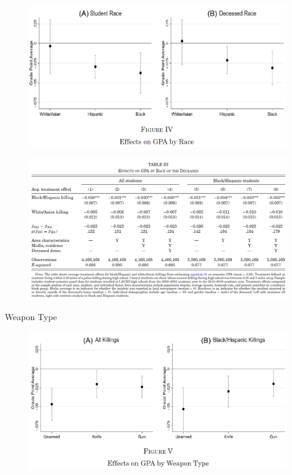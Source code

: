 \documentclass[dvipdfmx]{beamer}
\begin{document}
\begin{frame}{}
  \begin{figure}
    \centering
    \includegraphics[scale = .55]{fig_tab/os20220113/F4}
  \end{figure}
\end{frame}

\begin{frame}{}
  \begin{figure}
    \centering
    \includegraphics[scale = .55]{fig_tab/os20220113/T3}
  \end{figure}
\end{frame}

\begin{frame}{Weapon Type}
  \begin{figure}
    \centering
    \includegraphics[scale = .55]{fig_tab/os20220113/F5}
  \end{figure}
\end{frame}
\end{document}
